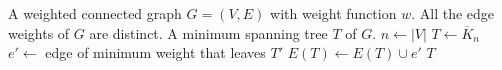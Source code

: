 
\begin{algorithmic}[1]
\Require A weighted connected graph $G = (V,E)$ with weight function
  $w$.  All the edge weights of $G$ are distinct.
\Ensure A minimum spanning tree $T$ of $G$.
\State $n \gets |V|$\label{alg:Boruvka:get_graph_order}
\State $T \gets \overline{K}_n$\label{alg:Boruvka:spanning_forest}
    \State $e' \gets$ edge of minimum weight that leaves $T'$
    \State $E(T) \gets E(T) \cup e'$\label{alg:Boruvka:while_loop_end}
  \EndFor
\EndWhile
\State \Return $T$
\end{algorithmic}
